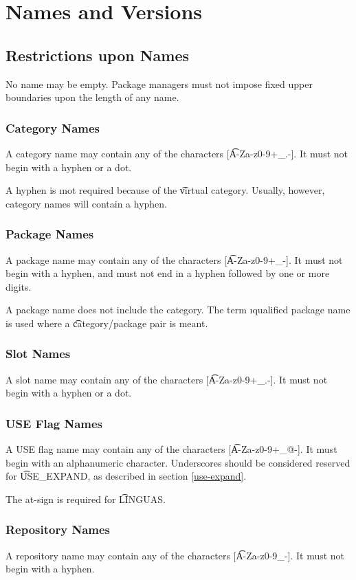 \chapter{Names and Versions}

\section{Restrictions upon Names}

No name may be empty. Package managers must not impose fixed upper boundaries upon the length of any
name.

\subsection{Category Names}
A category name may contain any of the characters [\t{A-Za-z0-9+\_.-}]. It must not begin with
a hyphen or a dot.

\note A hyphen is \i{not} required because of the \t{virtual} category. Usually, however, category
names will contain a hyphen.

\subsection{Package Names}
A package name may contain any of the characters [\t{A-Za-z0-9+\_-}]. It must not begin with a
hyphen, and must not end in a hyphen followed by one or more digits.

\note A package name does not include the category. The term \i{qualified package name} is used
where a \t{category/package} pair is meant.

\subsection{Slot Names}
\label{slot-names}
A slot name may contain any of the characters [\t{A-Za-z0-9+\_.-}]. It must not begin with a
hyphen or a dot.

\subsection{USE Flag Names}
A USE flag name may contain any of the characters [\t{A-Za-z0-9+\_@-}]. It must begin with an
alphanumeric character. Underscores should be considered reserved for \t{USE\_EXPAND}, as
described in section \ref{use-expand}.

\note The at-sign is required for \t{LINGUAS}.

\subsection{Repository Names}
\label{repository-names}
A repository name may contain any of the characters [\t{A-Za-z0-9\_-}]. It must not begin with a
hyphen.

